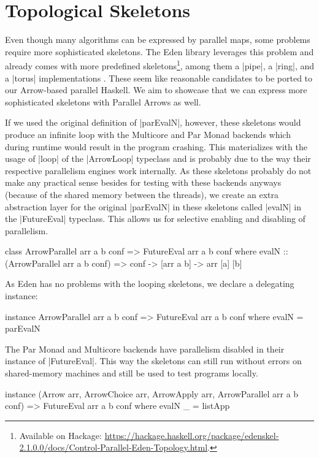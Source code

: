 \section{Topological Skeletons}
\label{sec:topology-skeletons}
Even though many algorithms can be expressed by parallel maps, some problems require more sophisticated skeletons. The Eden library leverages this problem and already comes with more predefined skeletons\footnote{Available on Hackage: \url{https://hackage.haskell.org/package/edenskel-2.1.0.0/docs/Control-Parallel-Eden-Topology.html}.}, among them a |pipe|, a |ring|, and a |torus| implementations \cite{Loogen2012}. These seem like reasonable candidates to be ported to our Arrow-based parallel Haskell. We aim to showcase that we can express more sophisticated skeletons with Parallel Arrows as well.

If we used the original definition of |parEvalN|, however, these skeletons would produce an infinite loop with the Multicore and Par Monad backends which during runtime would result in the program crashing. This materializes with the usage of |loop| of the |ArrowLoop| typeclass and is probably due to the way their respective parallelism engines work internally.  As these skeletons probably do not make any practical sense besides for testing with these backends anyways (because of the shared memory between the threads), we create an extra abstraction layer for the original |parEvalN| in these skeletons called |evalN| in the |FutureEval| typeclass. This allows us for selective enabling and disabling of parallelism.
\begin{code}
class ArrowParallel arr a b conf => FutureEval arr a b conf where
    evalN :: (ArrowParallel arr a b conf) => conf -> [arr a b] -> arr [a] [b]
\end{code}
As Eden has no problems with the looping skeletons, we declare a delegating instance:
\begin{code}
instance ArrowParallel arr a b conf => FutureEval arr a b conf where
    evalN = parEvalN
\end{code}
The Par Monad and Multicore backends have parallelism disabled in their instance of |FutureEval|. This way the skeletons can still run without errors on shared-memory machines and still be used to test programs locally.
\begin{code}
instance (Arrow arr, ArrowChoice arr, ArrowApply arr,
    ArrowParallel arr a b conf) => FutureEval arr a b conf where
    evalN _ = listApp
\end{code}


